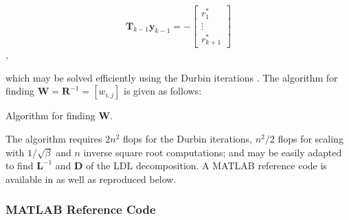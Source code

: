 $$\boldsymbol{T}_{k-1} \boldsymbol{y}_{k-1} = - \begin{bmatrix} r^*_1 \\ \vdots \\ r^*_{k+1} \end{bmatrix}$$,

which may be solved efficiently using the Durbin iterations \cite{Golub2012}. The algorithm for finding $\boldsymbol{W} = \boldsymbol{R}^{-1} = [w_{i,j}]$ is given as follows:

\begin{algorithm}[H]
\caption{Algorithm for finding $\boldsymbol{W}.$}
\begin{algorithmic}[1]
	\EndFor
\end{algorithmic}
\end{algorithm}

The algorithm requires $2n^2$ flops \cite[Algorithm 4.7.1]{Golub2012} for the Durbin iterations, $n^2/2$ flops for scaling with $1/\sqrt\beta$ and $n$ inverse square root computations; and may be easily adapted to find $\boldsymbol{L}^{-1}$ and $\boldsymbol{D}$ of the LDL decomposition. A MATLAB reference code is available in \cite{KrishnamoorthyMathWorks2015} as well as reproduced below.

\subsubsection{MATLAB Reference Code}

